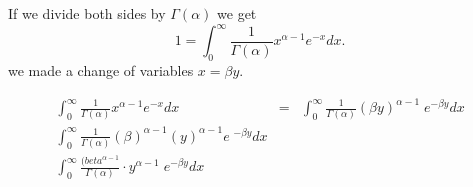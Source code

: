 \documentclass[a4paper,12pt]{article}
\begin{document}
If we divide both sides by $\Gamma(\alpha)$ we get
\[ 1 = \int^{\infty}_{0} \frac{1}{\Gamma(\alpha) }x^{\alpha−1}e^{−x}dx.\]  we made a change of variables $x = \beta y$. 


\begin{eqnarray*}
\int^{\infty}_{0} \frac{1}{\Gamma(\alpha) }x^{\alpha−1}e^{−x}dx &=&  \int^{\infty}_{0} \frac{1}{\Gamma(\alpha) }(\beta y)^{\alpha−1}\;e^{−\beta y}dx \\
\int^{\infty}_{0} \frac{1}{\Gamma(\alpha) }(\beta)^{\alpha−1} (y)^{\alpha−1}e\;^{−\beta y}dx\\
\int^{\infty}_{0} \frac{(beta^{\alpha−1}}{\Gamma(\alpha) } \cdot y^{\alpha−1}\;e^{−\beta y}dx\\
\end{eqnarray*}

\end{document}
